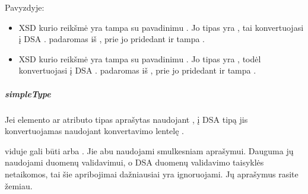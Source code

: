 \documentclass[letterpaper,10pt,lithuanian]{sphinxmanual}
\begin{document}
\sphinxAtStartPar
Pavyzdyje:
\begin{itemize}
\item {} 
\sphinxAtStartPar
XSD  kurio  reikšmė yra  tampa {\hyperref[\detokenize{formatas:property}]{}} su pavadinimu .
Jo tipas yra , tai konvertuojasi į DSA {\hyperref[\detokenize{dimensijos:property.type}]{}} . {\hyperref[\detokenize{dimensijos:property.source}]{}}
padaromas iš   , prie jo pridedant  ir tampa .

\item {} 
\sphinxAtStartPar
XSD  kurio  reikšmė yra  tampa {\hyperref[\detokenize{formatas:property}]{}} su pavadinimu .
Jo tipas yra , todėl konvertuojasi į DSA {\hyperref[\detokenize{dimensijos:property.type}]{}} . {\hyperref[\detokenize{dimensijos:property.source}]{}}
padaromas iš   , prie jo pridedant  ir tampa .

\end{itemize}


\subparagraph{simpleType}
\label{\detokenize{schemos/xsd:simpletype}}\label{\detokenize{schemos/xsd:xsd-simpletype}}
\sphinxAtStartPar
Jei elemento ar atributo tipas aprašytas naudojant , į DSA tipą jis
konvertuojamas naudojant konvertavimo lentelę .

\sphinxAtStartPar
{} viduje gali būti  arba . Jie abu naudojami smulkesniam
 aprašymui. Dauguma jų naudojami duomenų validavimui, o DSA duomenų validavimo
taisyklės netaikomos, tai šie apribojimai dažniausiai yra ignoruojami. Jų aprašymus rasite žemiau.
\end{document}
